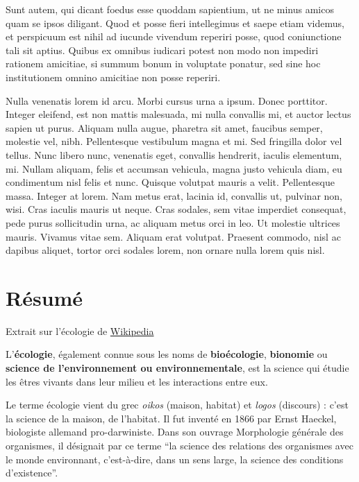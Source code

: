 \documentclass[twoside]{extreport}
\begin{document}
Sunt autem, qui dicant foedus esse quoddam sapientium, ut ne minus
amicos quam se ipsos diligant. Quod et posse fieri intellegimus et saepe
etiam videmus, et perspicuum est nihil ad iucunde vivendum reperiri
posse, quod coniunctione tali sit aptius. Quibus ex omnibus iudicari
potest non modo non impediri rationem amicitiae, si summum bonum in
voluptate ponatur, sed sine hoc institutionem omnino amicitiae non posse
reperiri.

Nulla venenatis lorem id arcu. Morbi cursus urna a ipsum. Donec
porttitor. Integer eleifend, est non mattis malesuada, mi nulla
convallis mi, et auctor lectus sapien ut purus. Aliquam nulla augue,
pharetra sit amet, faucibus semper, molestie vel, nibh. Pellentesque
vestibulum magna et mi. Sed fringilla dolor vel tellus. Nunc libero
nunc, venenatis eget, convallis hendrerit, iaculis elementum, mi. Nullam
aliquam, felis et accumsan vehicula, magna justo vehicula diam, eu
condimentum nisl felis et nunc. Quisque volutpat mauris a velit.
Pellentesque massa. Integer at lorem. Nam metus erat, lacinia id,
convallis ut, pulvinar non, wisi. Cras iaculis mauris ut neque. Cras
sodales, sem vitae imperdiet consequat, pede purus sollicitudin urna, ac
aliquam metus orci in leo. Ut molestie ultrices mauris. Vivamus vitae
sem. Aliquam erat volutpat. Praesent commodo, nisl ac dapibus aliquet,
tortor orci sodales lorem, non ornare nulla lorem quis nisl.

\hypertarget{ruxe9sumuxe9}{%
\chapter{Résumé}\label{ruxe9sumuxe9}}

Extrait sur l'écologie de
\href{https://fr.wikipedia.org/wiki/\%C3\%89cologie}{Wikipedia}

L'\textbf{écologie}, également connue sous les noms de
\textbf{bioécologie}, \textbf{bionomie} ou \textbf{science de
l'environnement ou environnementale}, est la science qui étudie les
êtres vivants dans leur milieu et les interactions entre eux.

Le terme écologie vient du grec \emph{oikos} (maison, habitat) et
\emph{logos} (discours) : c'est la science de la maison, de l'habitat.
Il fut inventé en 1866 par Ernst Haeckel, biologiste allemand
pro-darwiniste. Dans son ouvrage Morphologie générale des organismes, il
désignait par ce terme ``la science des relations des organismes avec le
monde environnant, c'est-à-dire, dans un sens large, la science des
conditions d'existence''.
\end{document}
